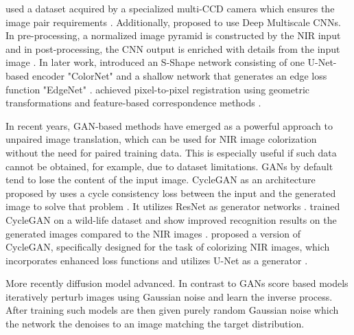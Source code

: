  used a dataset acquired by a specialized multi-CCD camera which ensures the image pair requirements \parencite{limmer}.
Additionally,  proposed to use Deep Multiscale CNNs.
In pre-processing, a normalized image pyramid is constructed by the NIR input and in post-processing, the CNN output is enriched with details from the input image \parencite{limmer}.
In later work,  introduced an S-Shape network consisting of one U-Net-based encoder "ColorNet" and a shallow network that generates an edge loss function "EdgeNet" \parencite{s-shape}.
 achieved pixel-to-pixel registration using geometric transformations and feature-based correspondence methods \parencite{s-shape}.

In recent years, GAN-based methods have emerged as a powerful approach to unpaired image translation, which can be used for NIR image colorization without the need for paired training data.
This is especially useful if such data cannot be obtained, for example, due to dataset limitations.
GANs by default tend to lose the content of the input image. CycleGAN as an architecture proposed by  uses a cycle consistency loss between the input and the generated image to solve that problem \cite{cyclegan-original}.
It utilizes ResNet \parencite{resnet} as generator networks \parencite{cyclegan-original}.
 trained CycleGAN on a wild-life dataset and show improved recognition results on the generated images compared to the NIR images \parencite{cyclegan-camera-traps}.
 proposed a version of CycleGAN, specifically designed for the task of colorizing NIR images, which incorporates enhanced loss functions and utilizes U-Net as a generator \parencite{mehri}.

More recently diffusion model advanced. 
In contrast to GANs score based models iteratively perturb images using Gaussian noise and learn the inverse process. 
After training such models are then given purely random Gaussian noise which the network the denoises to an image matching the target distribution. 



